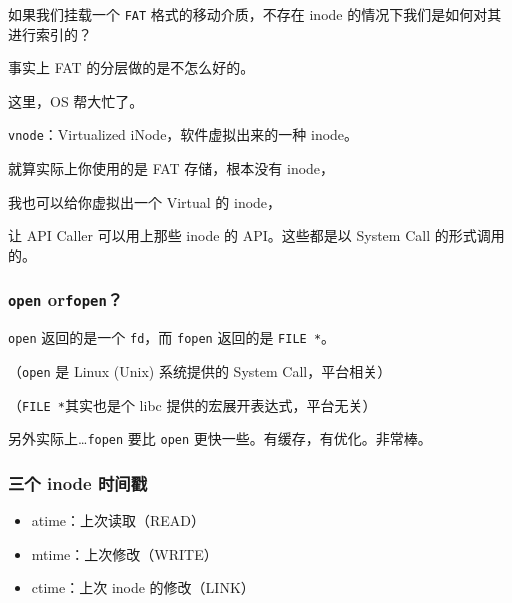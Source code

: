 \documentclass[
]{article}
\begin{document}
如果我们挂载一个 \texttt{FAT} 格式的移动介质，不存在 inode
的情况下我们是如何对其进行索引的？

事实上 FAT 的分层做的是不怎么好的。

这里，OS 帮大忙了。

\texttt{vnode}：Virtualized iNode，软件虚拟出来的一种 inode。

就算实际上你使用的是 FAT 存储，根本没有 inode，

我也可以给你虚拟出一个 Virtual 的 inode，

让 API Caller 可以用上那些 inode 的 API。这些都是以 System Call
的形式调用的。

\hypertarget{header-n199}{%
\subsubsection{\texorpdfstring{\texttt{open}
or\texttt{fopen}？}{open orfopen？}}\label{header-n199}}

\texttt{open} 返回的是一个 \texttt{fd}，而 \texttt{fopen} 返回的是
\texttt{FILE\ *}。

（\texttt{open} 是 Linux (Unix) 系统提供的 System Call，平台相关）

（\texttt{FILE\ *}其实也是个 libc 提供的宏展开表达式，平台无关）

另外实际上\ldots{}\texttt{fopen} 要比 \texttt{open}
更快一些。有缓存，有优化。非常棒。

\hypertarget{header-n204}{%
\subsubsection{三个 inode 时间戳}\label{header-n204}}

\begin{itemize}
\item
  atime：上次读取（READ）
\item
  mtime：上次修改（WRITE）
\item
  ctime：上次 inode 的修改（LINK）
\end{itemize}
\end{document}
